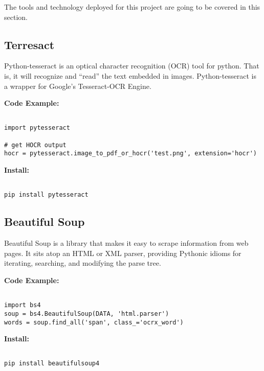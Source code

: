 The tools and technology deployed for this project are going to be covered in 
this section.

\subsection{Terresact}

Python-tesseract is an optical character recognition (OCR) tool for python.
That is, it will recognize and “read” the text embedded in images. Python-tesseract 
is a wrapper for Google’s Tesseract-OCR Engine\cite{hid-sp18-414-www-pytesseract}.

\bigskip
\noindent
\textbf{Code Example:}
\begin{footnotesize}
\begin{verbatim}

import pytesseract

# get HOCR output
hocr = pytesseract.image_to_pdf_or_hocr('test.png', extension='hocr')

\end{verbatim}
\end{footnotesize}
\noindent
\textbf{Install:}
\begin{footnotesize}
\begin{verbatim}

pip install pytesseract
\end{verbatim}
\end{footnotesize}

\subsection{Beautiful Soup}

Beautiful Soup is a library that makes it easy to scrape information from web pages.
It sits atop an HTML or XML parser, providing Pythonic idioms for iterating, searching,
and modifying the parse tree\cite{hid-sp18-414-www-beautifulsoup}.

\bigskip
\noindent
\textbf{Code Example:}
\begin{footnotesize}
\begin{verbatim}

import bs4
soup = bs4.BeautifulSoup(DATA, 'html.parser')
words = soup.find_all('span', class_='ocrx_word')

\end{verbatim}
\end{footnotesize}
\noindent
\textbf{Install:}
\begin{footnotesize}
\begin{verbatim}

pip install beautifulsoup4
\end{verbatim}
\end{footnotesize}


